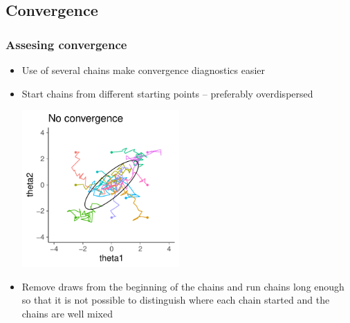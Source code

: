 \documentclass[10pt]{beamer}
\begin{document}
\begin{frame}

\subsection{Convergence}

\frametitle{Assesing convergence}

  \vspace{-0.5\baselineskip}
  \begin{itemize}
  \item Use of several chains make convergence diagnostics easier
    \item Start chains from different starting points -- preferably overdispersed
      \begin{center}
  \vspace{-0.5\baselineskip}
      \includegraphics[width=6cm]{figs/10chains1.pdf}
    \end{center}
  \vspace{-0.5\baselineskip}
    \item<2-> Remove draws from the beginning of the chains and run
      chains long enough so that it is not possible to distinguish
      where each chain started and the chains are well mixed
  \end{itemize}

\end{frame}
\end{document}
